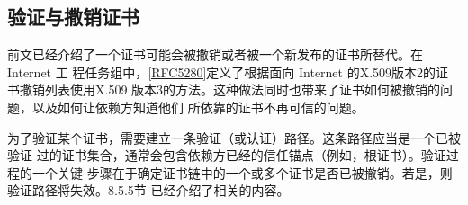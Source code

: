 \subsection{验证与撒销证书}

前文已经介绍了一个证书可能会被撒销或者被一个新发布的证书所替代。在 Internet 工
程任务组中，\href{https://www.rfc-editor.org/rfc/rfc5280}{[RFC5280]}定义了根据面向 Internet 的X.509版本2的证书撒销列表使用X.509
版本3的方法。这种做法同时也带来了证书如何被撤销的问题，以及如何让依赖方知道他们
所依靠的证书不再可信的问题。

为了验证某个证书，需要建立一条验证（或认证）路径。这条路径应当是一个已被验证
过的证书集合，通常会包含依赖方已经的信任锚点（例如，根证书）。验证过程的一个关键
步骤在于确定证书链中的一个或多个证书是否已被撤销。若是，则验证路径将失效。8.5.5节
已经介绍了相关的内容。

